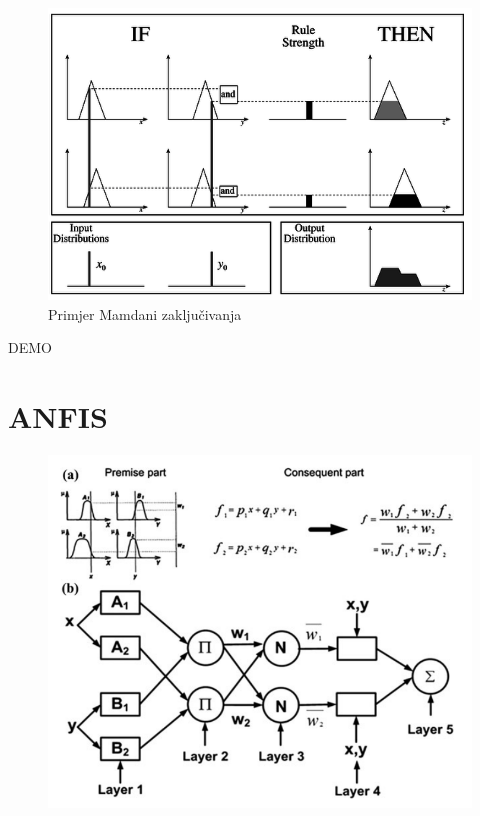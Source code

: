 \documentclass{beamer}
\begin{document}
\begin{frame}{}
\begin{figure}[h]
  \includegraphics[width=\textwidth]{img/fuzzy_inf.png}
  \caption{Primjer Mamdani zaključivanja}
\end{figure}
\end{frame}

\begin{frame}{DEMO}
\end{frame}



\section{ANFIS}

\begin{frame}{}
\begin{figure}[h]
  \includegraphics[width=\textwidth]{img/anfis.png}
\end{figure}
\end{frame}
\end{document}
